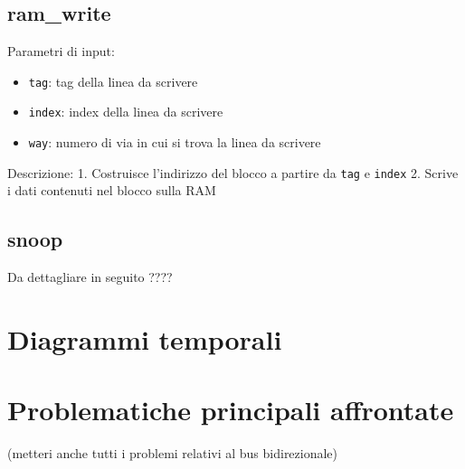 \subsection{ram\_write} %

Parametri di input:
\begin{itemize}
  \item \texttt{tag}: tag della linea da scrivere
  \item \texttt{index}: index della linea da scrivere
  \item \texttt{way}: numero di via in cui si trova la linea da scrivere
\end{itemize}

Descrizione:
	1. Costruisce l'indirizzo del blocco a partire da \texttt{tag} e \texttt{index}
	2. Scrive i dati contenuti nel blocco sulla RAM
	

\subsection{snoop}
	Da dettagliare in seguito ????
	

\section{Diagrammi temporali}

\section{Problematiche principali affrontate}

(metteri anche tutti i problemi relativi al bus bidirezionale)\\

